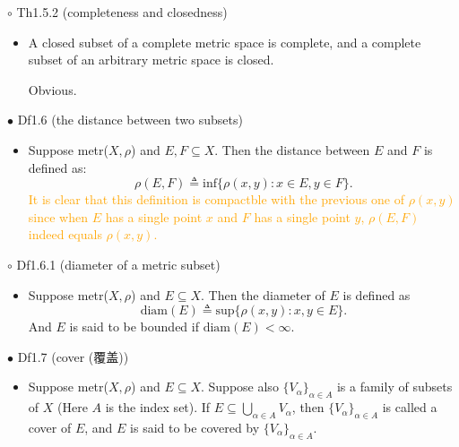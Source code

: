 \documentclass{article}
\begin{document}
{\Large $\circ $ Th1.5.2 (completeness and closedness)}\par
\begin{itemize}
    \item[]
    {\large A closed subset of a complete metric space is complete, 
    and a complete subset of an arbitrary metric space is closed.}\par
    {\textcolor{pf}{Obvious.}}
\end{itemize}\par
\quad

{\Large $\bullet $ Df1.6 (the distance between two subsets)}\par
\begin{itemize}
    \item[]
    {\large Suppose metr($X, \rho$) and $E, F\subseteq X$. 
    Then the distance between $E$ and $F$ is defined as:
    $$\rho(E,F) \triangleq \text{inf} \{\rho(x,y):x\in E, y\in F\}.$$}
    {\textcolor{orange}{It is clear that this definition is compactble 
    with the previous one of $\rho(x,y)$ since when $E$ has a single 
    point $x$ and $F$ has a single point $y$, $\rho(E,F)$ indeed equals $\rho(x,y)$.}}
\end{itemize}\par
\quad

{\Large $\circ $ Df1.6.1 (diameter of a metric subset)}\par
\begin{itemize}
    \item[]
    {\large Suppose metr($X, \rho$) and $E\subseteq X$. Then the diameter of $E$ is defined as
    $$\text{diam}(E)\triangleq \text{sup}\{\rho(x,y):x,y\in E\}.$$
    And $E$ is said to be bounded if $\text{diam}(E)<\infty$.}
\end{itemize}\par
\quad

{\Large $\bullet $ Df1.7 (cover (覆盖))}\par
\begin{itemize}
    \item[]
    {\large Suppose metr($X, \rho$) and $E\subseteq X$. 
    Suppose also $\{V_\alpha\}_{\alpha \in A}$ is a family of subsets of $X$ 
    (Here $A$ is the index set). If $E\subseteq \bigcup_{\alpha \in A}V_\alpha$, then 
    $\{V_\alpha\}_{\alpha \in A}$ is called a cover of $E$, 
    and $E$ is said to be covered by $\{V_\alpha\}_{\alpha \in A}$.}
\end{itemize}\par
\quad
\end{document}
